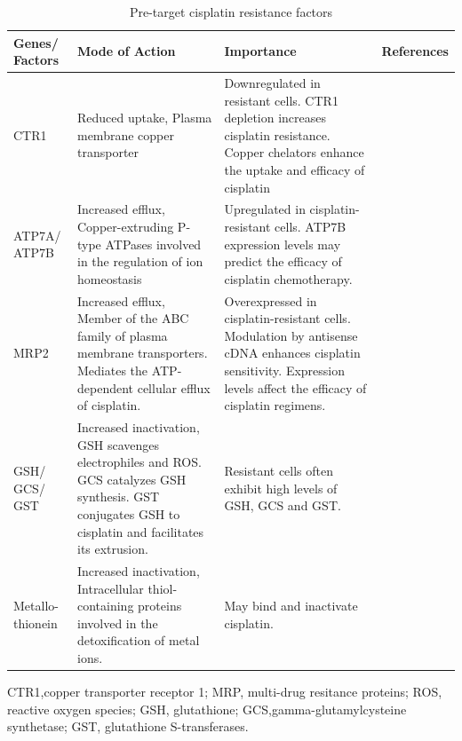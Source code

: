 \begin{table}[htbp]
   \centering
   \caption{Pre-target cisplatin resistance factors}
\begin{tabular}{p{1.5cm}p{5cm}p{5cm}p{1cm}}
\hline
\textbf{Genes/ Factors} & \multicolumn{1}{l}{ \textbf{Mode of Action}} & \multicolumn{1}{p{5cm}}{ \textbf{Importance}} & \multicolumn{1}{p{5cm}}{ \textbf{References}} \\ \hline

CTR1   & Reduced uptake, Plasma membrane copper transporter & Downregulated in resistant cells. CTR1 depletion increases cisplatin resistance. Copper chelators enhance the uptake and efficacy of cisplatin & \multicolumn{1}{p{5cm}}{ \cite{more2010role, ishida2010enhancing,holzer2006contribution,katano2002acquisition}} \\

ATP7A/ ATP7B & Increased efflux, Copper-extruding P-type ATPases involved in the regulation of ion homeostasis & Upregulated in cisplatin-resistant cells. ATP7B expression levels may predict the efficacy of cisplatin chemotherapy.  & \multicolumn{1}{p{5cm}}{\cite{katano2002acquisition,komatsu2000copper,nakayama2002copper,safaei2004role,aida2005expression}} \\ 

MRP2   & Increased efflux, Member of the ABC family of plasma membrane transporters. Mediates the ATP-dependent cellular efflux of cisplatin. & Overexpressed in cisplatin-resistant cells. Modulation by antisense cDNA enhances cisplatin sensitivity. Expression levels affect the efficacy of cisplatin regimens. & \multicolumn{1}{p{5cm}}{\cite{cui1999drug,korita2010multidrug,liedert2003overexpression, yamasaki2011role}} \\

GSH/ GCS/ GST & Increased inactivation, GSH scavenges electrophiles and ROS. GCS catalyzes GSH synthesis. GST conjugates GSH to cisplatin and facilitates its extrusion. & Resistant cells often exhibit high levels of GSH, GCS and GST.  & \multicolumn{1}{p{5cm}}{\cite{lewis1988glutathione,chen2010role}} \\

Metallo-thionein & Increased inactivation, Intracellular thiol-containing proteins involved in the detoxification of metal ions. & May bind and inactivate cisplatin.  & \multicolumn{1}{p{5cm}}{\cite{kelley1988overexpression,kasahara1991metallothionein}} \\   \hline
\end{tabular}%
\begin{tablenotes}
\small
      \item  {CTR1,copper transporter receptor 1; MRP, multi-drug resitance proteins; ROS, reactive oxygen species; GSH, glutathione; GCS,gamma-glutamylcysteine synthetase; GST, glutathione S-transferases}.
    \end{tablenotes}
 
   \label{tab:pretargetcisplatinresistance}%
 \end{table}%

